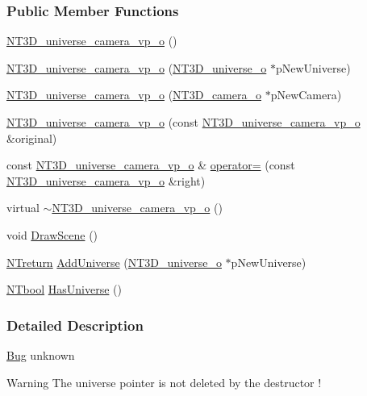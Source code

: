 \subsubsection*{Public Member Functions}
\begin{DoxyCompactItemize}
\item 
\hyperlink{class_n_t3_d__universe__camera__vp__o_a74df7e5c78d7ca01393c1b88ae6d118e}{NT3D\_\-universe\_\-camera\_\-vp\_\-o} ()
\item 
\hyperlink{class_n_t3_d__universe__camera__vp__o_a3bc3fe0e700c42978bdfe73e57c57b5a}{NT3D\_\-universe\_\-camera\_\-vp\_\-o} (\hyperlink{class_n_t3_d__universe__o}{NT3D\_\-universe\_\-o} $\ast$pNewUniverse)
\item 
\hyperlink{class_n_t3_d__universe__camera__vp__o_a66e3c612ff4f155d999c77039259096f}{NT3D\_\-universe\_\-camera\_\-vp\_\-o} (\hyperlink{class_n_t3_d__camera__o}{NT3D\_\-camera\_\-o} $\ast$pNewCamera)
\item 
\hyperlink{class_n_t3_d__universe__camera__vp__o_a5ce0c1c833a12398066243191df5eb91}{NT3D\_\-universe\_\-camera\_\-vp\_\-o} (const \hyperlink{class_n_t3_d__universe__camera__vp__o}{NT3D\_\-universe\_\-camera\_\-vp\_\-o} \&original)
\item 
const \hyperlink{class_n_t3_d__universe__camera__vp__o}{NT3D\_\-universe\_\-camera\_\-vp\_\-o} \& \hyperlink{class_n_t3_d__universe__camera__vp__o_a75f3510732b3f85d37a5faa28433c17b}{operator=} (const \hyperlink{class_n_t3_d__universe__camera__vp__o}{NT3D\_\-universe\_\-camera\_\-vp\_\-o} \&right)
\item 
virtual \hyperlink{class_n_t3_d__universe__camera__vp__o_a6873fc8f6d95ddfaeb7647523205d8ce}{$\sim$NT3D\_\-universe\_\-camera\_\-vp\_\-o} ()
\item 
void \hyperlink{class_n_t3_d__universe__camera__vp__o_a6c94c6e85110e5c85161b7e9972d1027}{DrawScene} ()
\item 
\hyperlink{nt__types_8h_ab9564ee8f091e809d21b8451c6683c53}{NTreturn} \hyperlink{class_n_t3_d__universe__camera__vp__o_a1663b3ec9a0d7ea996d8787c989f9584}{AddUniverse} (\hyperlink{class_n_t3_d__universe__o}{NT3D\_\-universe\_\-o} $\ast$pNewUniverse)
\item 
\hyperlink{nt__types_8h_a9f3200824a52174bb5be77bed3838822}{NTbool} \hyperlink{class_n_t3_d__universe__camera__vp__o_a5136a19d2afbc938f82c643c828a7718}{HasUniverse} ()
\end{DoxyCompactItemize}


\subsubsection{Detailed Description}
\begin{Desc}
\item[\hyperlink{bug__bug000045}{Bug}]unknown \end{Desc}
\begin{DoxyWarning}{Warning}
The universe pointer is not deleted by the destructor ! 
\end{DoxyWarning}


